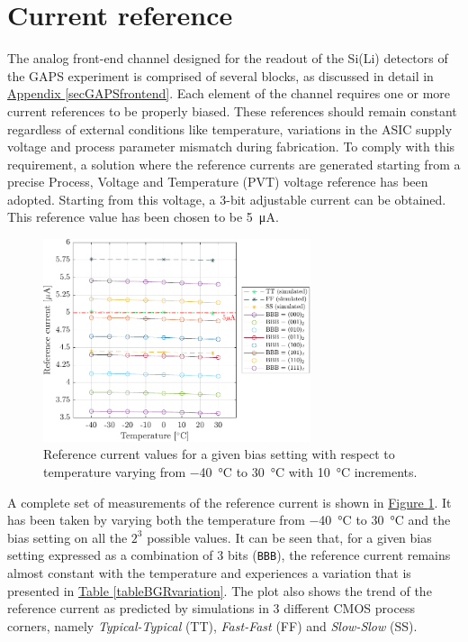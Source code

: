 
\section{Current reference}

The analog front-end channel designed for the readout of the Si(Li) detectors of the GAPS experiment is comprised of several blocks, as discussed in detail in \hyperref[secGAPSfrontend]{Appendix \ref{secGAPSfrontend}}. Each element of the channel requires one or more current references to be properly biased. These references should remain  constant regardless of external conditions like temperature, variations in the ASIC supply voltage and process parameter mismatch during fabrication. To comply with this requirement, a solution where the reference currents are generated starting from a precise Process, Voltage and Temperature (PVT) voltage reference has been adopted. Starting from this voltage, a 3-bit adjustable current can be obtained. This reference value has been chosen to be \SI{5}{\micro\ampere}.

\begin{figure}[h!]
    \centering
    \includegraphics[width=0.7\textwidth]{Images/chap1/results/BGR_current/BGR_current_Xtemp_all-BBB.pdf}
    \caption{Reference current values for a given bias setting with respect to temperature varying from \SI{-40}{\celsius} to \SI{30}{\celsius} with \SI{10}{\celsius} increments.}
    \label{figBGRplotsXtempall}
\end{figure}

\par
A complete set of measurements of the reference current is shown in \hyperref[figBGRplotsXtempall]{Figure \ref{figBGRplotsXtempall}}. It has been taken by varying both the temperature from \SI{-40}{\celsius} to \SI{30}{\celsius} and the bias setting on all the $2^{3}$ possible values. It can be seen that, for a given bias setting expressed as a combination of 3 bits (\texttt{BBB}), the reference current remains almost constant with the temperature and experiences a variation that is presented in \hyperref[tableBGRvariation]{Table \ref{tableBGRvariation}}. The plot also shows the trend of the reference current as predicted by simulations in 3 different CMOS process corners, namely \textit{Typical-Typical} (TT), \textit{Fast-Fast} (FF) and \textit{Slow-Slow} (SS).

